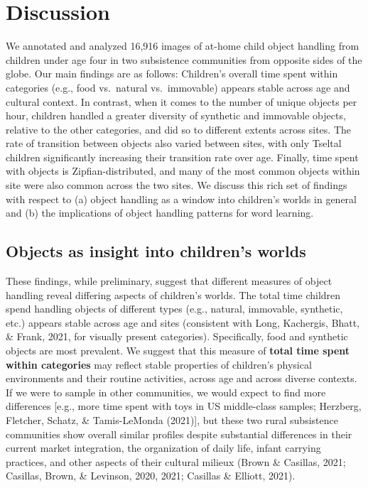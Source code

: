 \documentclass[10pt, letterpaper]{article}
\begin{document}
\hypertarget{discussion}{%
\section{Discussion}\label{discussion}}

We annotated and analyzed 16,916 images of at-home child object handling
from children under age four in two subsistence communities from
opposite sides of the globe. Our main findings are as follows:
Children's overall time spent within categories (e.g., food vs.~natural
vs.~immovable) appears stable across age and cultural context. In
contrast, when it comes to the number of unique objects per hour,
children handled a greater diversity of synthetic and immovable objects,
relative to the other categories, and did so to different extents across
sites. The rate of transition between objects also varied between sites,
with only Tseltal children significantly increasing their transition
rate over age. Finally, time spent with objects is Zipfian-distributed,
and many of the most common objects within site were also common across
the two sites. We discuss this rich set of findings with respect to (a)
object handling as a window into children's worlds in general and (b)
the implications of object handling patterns for word learning.

\hypertarget{objects-as-insight-into-childrens-worlds}{%
\subsection{Objects as insight into children's
worlds}\label{objects-as-insight-into-childrens-worlds}}

These findings, while preliminary, suggest that different measures of
object handling reveal differing aspects of children's worlds. The total
time children spend handling objects of different types (e.g., natural,
immovable, synthetic, etc.) appears stable across age and sites
(consistent with Long, Kachergis, Bhatt, \& Frank, 2021, for visually
present categories). Specifically, food and synthetic objects are most
prevalent. We suggest that this measure of \textbf{total time spent
within categories} may reflect stable properties of children's physical
environments and their routine activities, across age and across diverse
contexts. If we were to sample in other communities, we would expect to
find more differences {[}e.g., more time spent with toys in US
middle-class samples; Herzberg, Fletcher, Schatz, \& Tamis-LeMonda
(2021){]}, but these two rural subsistence communities show overall
similar profiles despite substantial differences in their current market
integration, the organization of daily life, infant carrying practices,
and other aspects of their cultural milieux (Brown \& Casillas, 2021;
Casillas, Brown, \& Levinson, 2020, 2021; Casillas \& Elliott, 2021).
\end{document}
